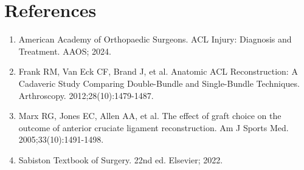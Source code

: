 \section*{References}
\begin{enumerate}
  \item American Academy of Orthopaedic Surgeons. ACL Injury: Diagnosis and Treatment. AAOS; 2024.
  
  \item Frank RM, Van Eck CF, Brand J, et al. Anatomic ACL Reconstruction: A Cadaveric Study Comparing Double-Bundle and Single-Bundle Techniques. Arthroscopy. 2012;28(10):1479-1487.
  
  \item Marx RG, Jones EC, Allen AA, et al. The effect of graft choice on the outcome of anterior cruciate ligament reconstruction. Am J Sports Med. 2005;33(10):1491-1498.
  
  \item Sabiston Textbook of Surgery. 22nd ed. Elsevier; 2022.
\end{enumerate}

\clearpage
